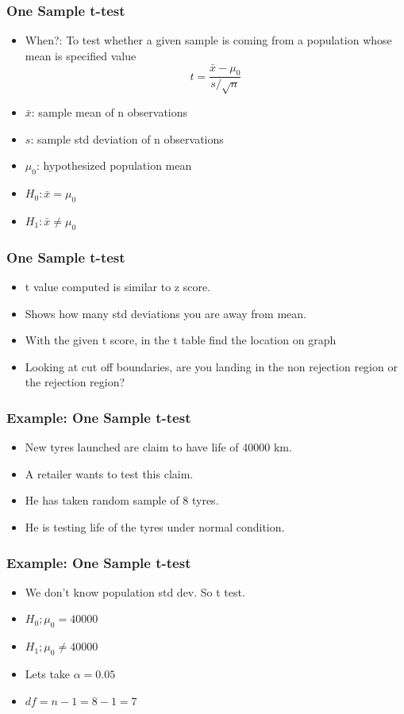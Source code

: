 \begin{frame}[fragile]\frametitle{One Sample t-test}
\begin{itemize}
\item When?: To test whether a given sample is coming from a population whose mean is specified value
$$
t = \frac{\bar{x} - \mu_0}{s /\sqrt{n}}
$$
\item $\bar{x}$: sample mean of n observations
\item $s$: sample std deviation of n observations
\item $\mu_0$: hypothesized population mean
\item $H_0: \bar{x} = \mu_0$
\item $H_1: \bar{x} \neq \mu_0$
\end{itemize}
\end{frame}

\begin{frame}[fragile]\frametitle{One Sample t-test}
\begin{itemize}
\item t value computed is similar to z score.
\item Shows how many std deviations you are away from mean.
\item With the given t score, in the t table find the location on graph
\item Looking at cut off boundaries, are you landing in the non rejection region or the rejection region?
\end{itemize}
\end{frame}

\begin{frame}[fragile]\frametitle{Example: One Sample t-test}
\begin{itemize}
\item New tyres launched are claim to have life of 40000 km.
\item A retailer wants to test this claim.
\item He has taken random sample of 8 tyres.
\item He is testing life of the tyres under normal condition.
\end{itemize}
\end{frame}

\begin{frame}[fragile]\frametitle{Example: One Sample t-test}
\begin{itemize}
\item We don't know population std dev. So t test.
\item $H_0; \mu_0 = 40000$ 
\item $H_1; \mu_0 \ne 40000$ 
\item Lets take $\alpha = 0.05$
\item $df = n -1 = 8 - 1 = 7$
\end{itemize}
\end{frame}

